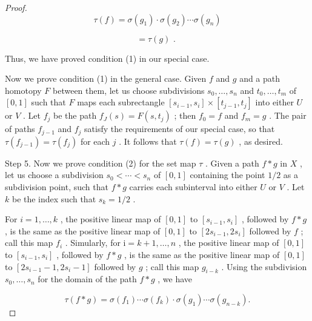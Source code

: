 \begin{proof}
\[
\tau \left( f\right)  = \sigma \left( {g}_{1}\right)  \cdot  \sigma \left( {g}_{2}\right) \cdots \sigma \left( {g}_{n}\right)
\]

\[
= \tau \left( g\right) \text{ . }
\]

Thus, we have proved condition (1) in our special case.

Now we prove condition (1) in the general case. Given \(f\) and \(g\) and a path homotopy \(F\) between them, let us choose subdivisions \({s}_{0},\ldots ,{s}_{n}\) and \({t}_{0},\ldots ,{t}_{m}\) of \(\left\lbrack  {0,1}\right\rbrack\) such that \(F\) maps each subrectangle \(\left\lbrack  {{s}_{i - 1},{s}_{i}}\right\rbrack \times  \left\lbrack  {{t}_{j - 1},{t}_{j}}\right\rbrack\) into either \(U\) or \(V\) . Let \({f}_{j}\) be the path \({f}_{J}\left( s\right)  = F\left( {s,{t}_{j}}\right)\) ; then \({f}_{0} = f\) and \({f}_{m} = g\) . The pair of paths \({f}_{j - 1}\) and \({f}_{j}\) satisfy the requirements of our special case, so that \(\tau \left( {f}_{j - 1}\right)  = \tau \left( {f}_{j}\right)\) for each \(j\) . It follows that \(\tau \left( f\right)  = \tau \left( g\right)\) , as desired.

Step 5. Now we prove condition (2) for the set map \(\tau\) . Given a path \(f * g\) in \(X\) , let us choose a subdivision \({s}_{0} < \cdots  < {s}_{n}\) of \(\left\lbrack  {0,1}\right\rbrack\) containing the point \(1/2\) as a subdivision point, such that \(f * g\) carries each subinterval into either \(U\) or \(V\) . Let \(k\) be the index such that \({s}_{k} = 1/2\) .

For \(i = 1,\ldots ,k\) , the positive linear map of \(\left\lbrack  {0,1}\right\rbrack\) to \(\left\lbrack  {{s}_{i - 1},{s}_{i}}\right\rbrack\) , followed by \(f * g\) , is the same as the positive linear map of \(\left\lbrack  {0,1}\right\rbrack\) to \(\left\lbrack  {2{s}_{i - 1},2{s}_{i}}\right\rbrack\) followed by \(f\) ; call this map \({f}_{i}\) . Simularly, for \(\mathrm{i} = k + 1,\ldots ,n\) , the positive linear map of \(\left\lbrack  {0,1}\right\rbrack\) to \(\left\lbrack  {{s}_{i - 1},{s}_{i}}\right\rbrack\) , followed by \(f * g\) , is the same as the positive linear map of \(\left\lbrack  {0,1}\right\rbrack\) to \(\left\lbrack  {2{s}_{i - 1} - 1,2{s}_{i} - 1}\right\rbrack\) followed by \(g\) ; call this map \({g}_{i - k}\) . Using the subdivision \({s}_{0},\ldots ,{s}_{n}\) for the domain of the path \(f * g\) , we have

\[
\tau \left( {f * g}\right)  = \sigma \left( {f}_{1}\right) \cdots \sigma \left( {f}_{k}\right)  \cdot  \sigma \left( {g}_{1}\right) \cdots \sigma \left( {g}_{n - k}\right) .
\]


\end{proof}
